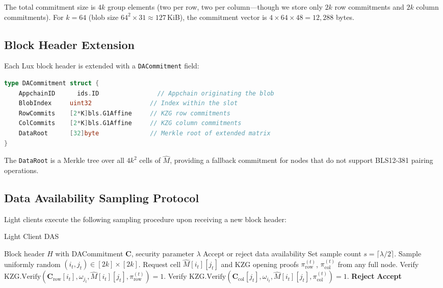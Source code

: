 \documentclass[11pt,a4paper]{article}
\theoremstyle{plain}
\theoremstyle{definition}
\theoremstyle{remark}
\begin{document}
The total commitment size is $4k$ group elements (two per row, two per column---though we
store only $2k$ row commitments and $2k$ column commitments). For $k = 64$ (blob size
$64^2 \times 31 \approx 127$\,KiB), the commitment vector is $4 \times 64 \times 48 = 12{,}288$
bytes.

\subsection{Block Header Extension}

Each Lux block header is extended with a \texttt{DACommitment} field:

\begin{lstlisting}[language=Go, caption={DACommitment structure}]
type DACommitment struct {
    AppchainID      ids.ID                // Appchain originating the blob
    BlobIndex     uint32                // Index within the slot
    RowCommits    [2*K]bls.G1Affine     // KZG row commitments
    ColCommits    [2*K]bls.G1Affine     // KZG column commitments
    DataRoot      [32]byte              // Merkle root of extended matrix
}
\end{lstlisting}

The \texttt{DataRoot} is a Merkle tree over all $4k^2$ cells of $\hat{M}$, providing a
fallback commitment for nodes that do not support BLS12-381 pairing operations.

\subsection{Data Availability Sampling Protocol}
\label{sec:protocol:sampling}

Light clients execute the following sampling procedure upon receiving a new block header:

\begin{algorithm}[H]
\caption{Light Client DAS}
\label{alg:das-sampling}
\begin{algorithmic}[1]
\Require Block header $H$ with DACommitment $\mathbf{C}$, security parameter $\lambda$
\Ensure Accept or reject data availability
\State Set sample count $s = \lceil \lambda / 2 \rceil$.
    \State Sample uniformly random $(i_t, j_t) \in [2k] \times [2k]$.
    \State Request cell $\hat{M}[i_t][j_t]$ and KZG opening proofs $\pi_{\text{row}}^{(t)}$,
           $\pi_{\text{col}}^{(t)}$ from any full node.
    \State Verify $\text{KZG.Verify}(\mathbf{C}_{\text{row}}[i_t], \omega_{j_t}, \hat{M}[i_t][j_t],
           \pi_{\text{row}}^{(t)}) = 1$.
    \State Verify $\text{KZG.Verify}(\mathbf{C}_{\text{col}}[j_t], \omega_{i_t}, \hat{M}[i_t][j_t],
           \pi_{\text{col}}^{(t)}) = 1$.
        \State \Return \textbf{Reject}
    \EndIf
\EndFor
\State \Return \textbf{Accept}
\end{algorithmic}
\end{algorithm}
\end{document}
